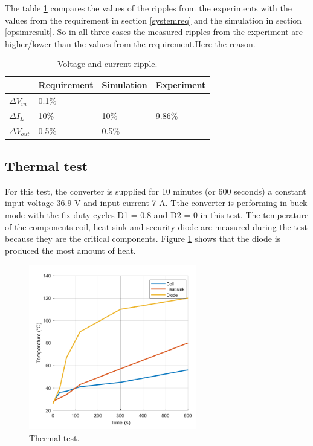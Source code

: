 The table \ref{tab:ripple} compares the values of the ripples from the experiments with the values from the requirement in section \ref{systemreq} and the simulation in section \ref{opsimresult}. So in all three cases the measured ripples from the experiment are higher/lower than the values from the requirement.Here the reason.

\begin{table}[H]
	\centering
	\begin{tabular}{|>{\centering}p{3.5cm}|p{3cm}|p{3cm}|p{3cm}|}
		\hline
		\rowcolor{lightgray} \textbf{} & \textbf{Requirement} & \textbf{Simulation}  & \textbf{Experiment}   \tabularnewline \hline
		$\Delta V_{in}$ & 0.1\% & - & - \tabularnewline \hline
		$\Delta I_{L}$ & 10\% & 10\% & 9.86\% \tabularnewline \hline
		$\Delta V_{out}$  & 0.5\% & 0.5\% & \tabularnewline \hline
		
	\end{tabular}
	\caption{Voltage and current ripple.}
	\label{tab:ripple}
\end{table}


\subsection{Thermal test}

For this test, the converter is supplied for 10 minutes (or 600 seconds) a constant input voltage 36.9 V and input current 7 A. Tthe converter is performing in buck mode with the fix duty cycles D1 = 0.8 and D2 = 0 in this test. The temperature of the components coil, heat sink and security diode are measured during the test because they are the critical components. Figure \ref{Testthermal} shows that the diode is produced the most amount of heat.

\begin{figure}[H]
	\begin{center}
		\includegraphics[width=0.65\textwidth]{../Pictures/P1/Test/Thermal_test_with_heat_sink}
		\caption{Thermal test.}
		\label{Testthermal}
	\end{center}	
\end{figure}

